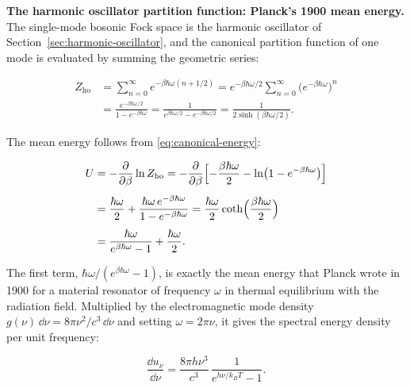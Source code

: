 \medskip\noindent\textbf{The harmonic oscillator partition function: Planck's 1900 mean energy.}
The single-mode bosonic Fock space is the harmonic oscillator of Section~\ref{sec:harmonic-oscillator}, and the canonical partition function of one mode is evaluated by summing the geometric series:
\begin{linenomath}
    \begin{equation}
        \begin{split}
            Z_{\text{ho}}
            &= \sum_{n=0}^{\infty} e^{-\beta\hbar\omega(n + 1/2)}
             = e^{-\beta\hbar\omega/2}\sum_{n=0}^{\infty}\bigl(e^{-\beta\hbar\omega}\bigr)^n \\[4pt]
            &= \frac{e^{-\beta\hbar\omega/2}}{1 - e^{-\beta\hbar\omega}}
             = \frac{1}{e^{\beta\hbar\omega/2} - e^{-\beta\hbar\omega/2}}
             = \frac{1}{2\sinh(\beta\hbar\omega/2)}.
        \end{split}
        \label{eq:oscillator-partition}
    \end{equation}
\end{linenomath}
The mean energy follows from \eqref{eq:canonical-energy}:
\begin{linenomath}
    \begin{align}
        U &= -\frac{\partial}{\partial\beta}\ln Z_{\text{ho}}
           = -\frac{\partial}{\partial\beta}
              \Bigl[-\frac{\beta\hbar\omega}{2} - \ln\bigl(1 - e^{-\beta\hbar\omega}\bigr)\Bigr] \notag \\[4pt]
          &= \frac{\hbar\omega}{2}
             + \frac{\hbar\omega\,e^{-\beta\hbar\omega}}{1 - e^{-\beta\hbar\omega}}
           = \frac{\hbar\omega}{2}\coth\Bigl(\frac{\beta\hbar\omega}{2}\Bigr) \notag \\[4pt]
          &= \frac{\hbar\omega}{e^{\beta\hbar\omega} - 1} + \frac{\hbar\omega}{2}.
    \end{align}
\end{linenomath}
The first term, $\hbar\omega/(e^{\beta\hbar\omega} - 1)$, is exactly the mean energy that Planck wrote in 1900 for a material resonator of frequency $\omega$ in thermal equilibrium with the radiation field. Multiplied by the electromagnetic mode density $g(\nu)\,\dd\nu = 8\pi\nu^2/c^3\,\dd\nu$ and setting $\omega = 2\pi\nu$, it gives the spectral energy density per unit frequency:
\begin{linenomath}
    \begin{equation}
        \frac{\dd u_\nu}{\dd\nu}
        = \frac{8\pi h\nu^3}{c^3}\,
          \frac{1}{e^{h\nu/k_B T} - 1}.
        \label{eq:plancks-law-recovered}
    \end{equation}
\end{linenomath}
